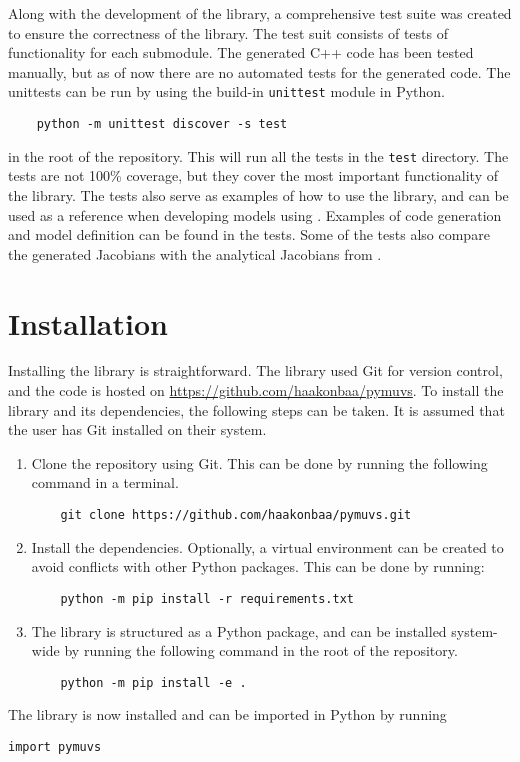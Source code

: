 Along with the development of the \pymuvs{} library, a comprehensive test suite
was created to ensure the correctness of the library. The test suit consists of
tests of functionality for each submodule. The generated C++ code has been tested
manually, but as of now there are no automated tests for the generated code. The
unittests can be run by using the build-in \texttt{unittest} module in Python.
\begin{verbatim}
    python -m unittest discover -s test
\end{verbatim}
in the root of the repository. This will run all the tests in the \texttt{test}
directory. The tests are not 100\% coverage, but they cover the most important
functionality of the library. The tests also serve as examples of how to use the
library, and can be used as a reference when developing models using \pymuvs{}.
Examples of code generation and model definition can be found in the tests. Some
of the tests also compare the generated Jacobians with the analytical Jacobians
from \cite{fossen2021}.


\section{Installation}

Installing the \pymuvs{ }library is straightforward. The library used Git for
version control, and the code is hosted on \url{https://github.com/haakonbaa/pymuvs}.
To install the library and its dependencies, the following steps can be taken. It
is assumed that the user has Git installed on their system.
\begin{enumerate}
    \item Clone the repository using Git. This can be done by running the following
    command in a terminal.
    \begin{verbatim}
    git clone https://github.com/haakonbaa/pymuvs.git
    \end{verbatim}
    \item Install the dependencies. Optionally, a virtual environment can be created
    to avoid conflicts with other Python packages. This can be done by running:
    \begin{verbatim}
    python -m pip install -r requirements.txt
    \end{verbatim}
\item The library is structured as a Python package, and can be installed system-wide
    by running the following command in the root of the repository.
    \begin{verbatim}
    python -m pip install -e .
    \end{verbatim}
\end{enumerate}
The library is now installed and can be imported in Python by running
\begin{lstlisting}[caption={Importing the \pymuvs{ }package},
    style=custompython,
    label={lst:pymuvs:example}]
import pymuvs
\end{lstlisting}


